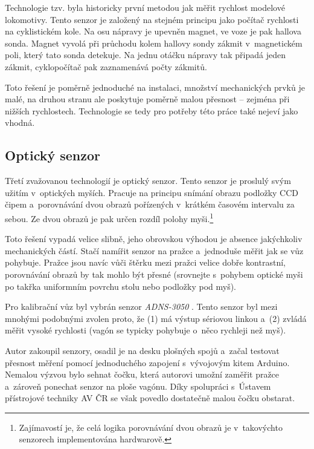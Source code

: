 Technologie tzv.  byla historicky první metodou jak měřit
rychlost modelové lokomotivy. Tento senzor je založený na stejném principu jako
počítač rychlosti na cyklistickém kole. Na osu nápravy je upevněn magnet, ve
voze je pak hallova sonda. Magnet vyvolá při průchodu kolem hallovy sondy
zákmit v~magnetickém poli, který tato sonda detekuje. Na jednu otáčku nápravy
tak připadá jeden zákmit, cyklopočítač pak zaznamenává počty zákmitů.

Toto řešení je poměrně jednoduché na instalaci, množství mechanických prvků je
malé, na druhou stranu ale poskytuje poměrně malou přesnost -- zejména při
nižších rychlostech. Technologie  se tedy pro potřeby této
práce také nejeví jako vhodná.

\subsection{Optický senzor}
\label{subsec:wsm-senzor-opto}

Třetí zvažovanou technologií je optický senzor. Tento senzor je proslulý svým
užitím v~optických myších. Pracuje na principu snímání obrazu podložky CCD
čipem a~porovnávání dvou obrazů pořízených v~krátkém časovém intervalu za
sebou. Ze dvou obrazů je pak určen rozdíl polohy myši.\footnote{Zajímavostí
je, že celá logika porovnávání dvou obrazů je v~takovýchto senzorech
implementována hardwarově.}

Toto řešení vypadá velice slibně, jeho obrovskou výhodou je absence jakýchkoliv
mechanických částí. Stačí namířit senzor na pražce a~jednoduše měřit jak se vůz
pohybuje. Pražce jsou navíc vůči štěrku mezi pražci velice dobře kontrastní,
porovnávání obrazů by tak mohlo být přesné (srovnejte s~pohybem optické
myši po takřka uniformním povrchu stolu nebo podložky pod myš).

Pro kalibrační vůz byl vybrán senzor \textit{ADNS-3050} \cite{adns-3050}.
Tento senzor byl mezi mnohými podobnými zvolen proto, že (1) má výstup sériovou
linkou a~(2) zvládá měřit vysoké rychlosti (vagón se typicky pohybuje o~něco
rychleji než myš).

Autor zakoupil senzory, osadil je na desku plošných spojů a~začal testovat
přesnost měření pomocí jednoduchého zapojení s~vývojovým kitem Arduino. Nemalou
výzvou bylo sehnat čočku, která autorovi umožní zaměřit pražce a~zároveň
ponechat senzor na ploše vagónu. Díky spolupráci s~Ústavem přístrojové techniky
AV ČR se však povedlo dostatečně malou čočku obstarat.

